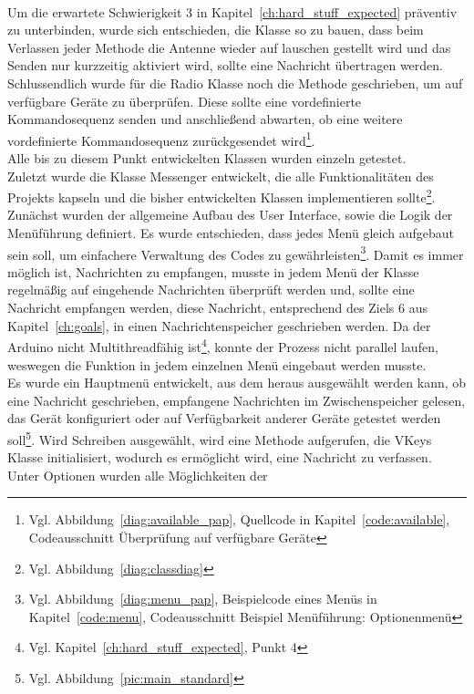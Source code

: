 \documentclass[a4paper, 11pt]{scrartcl}
\begin{document}
\\
Um die erwartete Schwierigkeit 3 in Kapitel~\ref{ch:hard_stuff_expected} präventiv zu unterbinden, wurde sich entschieden, die Klasse so zu bauen, dass beim Verlassen
jeder Methode die Antenne wieder auf lauschen gestellt wird und das Senden nur kurzzeitig aktiviert wird, sollte eine Nachricht übertragen werden.
\\
Schlussendlich wurde für die \glqq Radio\grqq{} Klasse noch die Methode geschrieben, um auf verfügbare Geräte zu überprüfen. Diese sollte eine vordefinierte Kommandosequenz senden
und anschließend abwarten, ob eine weitere vordefinierte Kommandosequenz zurückgesendet 
wird\footnote{Vgl. Abbildung~\ref{diag:available_pap}, Quellcode in Kapitel~\ref{code:available}, Codeausschnitt \glqq Überprüfung auf verfügbare Geräte\grqq{}}.
\\
Alle bis zu diesem Punkt entwickelten Klassen wurden einzeln getestet.
\\
Zuletzt wurde die Klasse \glqq Messenger\grqq{} entwickelt, die alle Funktionalitäten des Projekts kapseln und die bisher entwickelten Klassen implementieren 
sollte\footnote{Vgl. Abbildung~\ref{diag:classdiag}}.
\\
Zunächst wurden der allgemeine Aufbau des User Interface, sowie die Logik der Menüführung definiert. Es wurde entschieden, dass jedes Menü gleich aufgebaut 
sein soll, um einfachere Verwaltung des Codes zu gewährleisten\footnote{Vgl. Abbildung~\ref{diag:menu_pap}, Beispielcode eines Menüs in Kapitel~\ref{code:menu}, 
Codeausschnitt \glqq Beispiel Menüführung: Optionenmenü\grqq{}}. Damit es immer möglich ist, Nachrichten zu empfangen, musste in jedem Menü der Klasse regelmäßig
auf eingehende Nachrichten überprüft werden und, sollte eine Nachricht empfangen werden, diese Nachricht, entsprechend des Ziels 6 aus Kapitel~\ref{ch:goals},
in einen Nachrichtenspeicher geschrieben werden. Da der Arduino nicht Multithreadfähig ist\footnote{Vgl. Kapitel~\ref{ch:hard_stuff_expected}, Punkt 4}, konnte der Prozess
nicht parallel laufen, weswegen die Funktion in jedem einzelnen Menü eingebaut werden musste.
\\
Es wurde ein Hauptmenü entwickelt, aus dem heraus ausgewählt werden kann, ob eine Nachricht geschrieben, empfangene Nachrichten im Zwischenspeicher gelesen, das Gerät konfiguriert
oder auf Verfügbarkeit anderer Geräte getestet werden soll\footnote{Vgl. Abbildung~\ref{pic:main_standard}}. Wird \glqq Schreiben\grqq{} ausgewählt, wird eine Methode aufgerufen,
die \glqq VKeys\grqq{} Klasse initialisiert, wodurch es ermöglicht wird, eine Nachricht zu verfassen. Unter \glqq Optionen\grqq{} wurden alle Möglichkeiten der 
\end{document}
